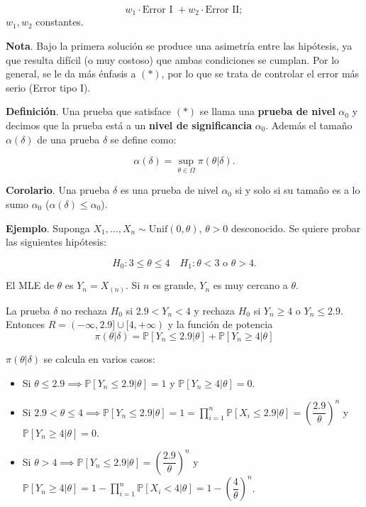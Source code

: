 \documentclass[
  12pt,
]{book}
\begin{document}
\[w_1\cdot\text{Error I } + w_2\cdot\text{Error II};\]
\(w_1,w_2\) constantes.

\textbf{Nota}. Bajo la primera solución se produce una asimetría entre las hipótesis, ya que resulta difícil (o muy costoso) que ambas condiciones se cumplan. Por lo general, se le da más énfasis a \((*)\), por lo que se trata de controlar el error más serio (Error tipo I).

\textbf{Definición}. Una prueba que satisface \((*)\) se llama una \textbf{prueba de nivel} \(\alpha_0\) y decimos que la prueba está a un \textbf{nivel de significancia} \(\alpha_0\). Además el tamaño \(\alpha(\delta)\) de una prueba \(\delta\) se define como:

\[\alpha(\delta) = \sup_{\theta\in\Omega}\pi(\theta|\delta).\]

\textbf{Corolario}. Una prueba \(\delta\) es una prueba de nivel \(\alpha_0\) si y solo si su tamaño es a lo sumo \(\alpha_0\) (\(\alpha(\delta)\leq\alpha_0\)).

\textbf{Ejemplo}. Suponga \(X_1,\dots,X_n\sim \text{Unif}(0,\theta)\), \(\theta>0\) desconocido. Se quiere probar las siguientes hipótesis:

\[H_0: 3\leq\theta\leq 4 \quad H_1:\theta<3 \text{ o }\theta>4. \]

El MLE de \(\theta\) es \(Y_n = X_{(n)}\). Si \(n\) es grande, \(Y_n\) es muy cercano a \(\theta\).

La prueba \(\delta\) no rechaza \(H_0\) si \(2.9<Y_n<4\) y rechaza \(H_0\) si \(Y_n\geq4\) o \(Y_n\leq2.9\). Entonces \(R = (-\infty, 2.9] \cup [4,+\infty)\) y la función de potencia
\[\pi(\theta|\delta) = \mathbb P[Y_n\leq 2.9|\theta]+\mathbb P[Y_n\geq4|\theta] \]

\(\pi(\theta|\delta)\) se calcula en varios casos:

\begin{itemize}
\item
  Si \(\theta\leq 2.9 \implies \mathbb P[Y_n\leq 2.9|\theta] = 1\) y \(\mathbb P[Y_n\geq4|\theta] = 0\).
\item
  Si \(2.9<\theta\leq4 \implies \mathbb P[Y_n\leq 2.9|\theta] = 1 = \prod_{i=1}^n \mathbb P[X_i\leq2.9|\theta] = \left(\dfrac{2.9}{\theta}\right)^n\) y \(\mathbb P[Y_n\geq4|\theta] = 0\).
\item
  Si \(\theta>4 \implies \mathbb P[Y_n\leq 2.9|\theta] = \left(\dfrac{2.9}{\theta}\right)^n\) y \(\mathbb P[Y_n\geq 4|\theta] = 1 - \displaystyle\prod_{i=1}^n \mathbb P[X_i<4|\theta] = 1-\left(\dfrac 4\theta\right)^n\).
\end{itemize}
\end{document}
